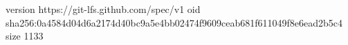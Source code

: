 version https://git-lfs.github.com/spec/v1
oid sha256:0a4584d04d6a2174d40bc9a5e4bb02474f9609ceab681f611049f8e6ead2b5c4
size 1133
